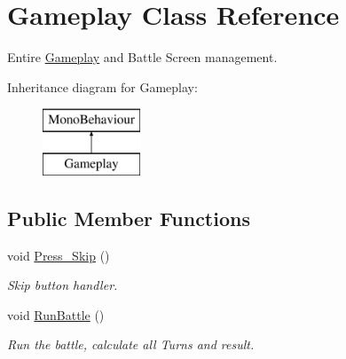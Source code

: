 \hypertarget{class_gameplay}{}\section{Gameplay Class Reference}
\label{class_gameplay}


Entire \mbox{\hyperlink{class_gameplay}{Gameplay}} and Battle Screen management.  


Inheritance diagram for Gameplay\+:\begin{figure}[H]
\begin{center}
\leavevmode
\includegraphics[height=2.000000cm]{class_gameplay}
\end{center}
\end{figure}
\subsection*{Public Member Functions}
\begin{DoxyCompactItemize}
\item 
\mbox{\label{class_gameplay_af68b4ea2b131c1c77a5daf9c5a0b5b5e}} 
void \mbox{\hyperlink{class_gameplay_af68b4ea2b131c1c77a5daf9c5a0b5b5e}{Press\+\_\+\+Skip}} ()
\begin{DoxyCompactList}\small\item\em Skip button handler. \end{DoxyCompactList}\item 
\mbox{\label{class_gameplay_a314779fdcab62c148dbf587aa0ab4f67}} 
void \mbox{\hyperlink{class_gameplay_a314779fdcab62c148dbf587aa0ab4f67}{Run\+Battle}} ()
\begin{DoxyCompactList}\small\item\em Run the battle, calculate all Turns and result. \end{DoxyCompactList}\end{DoxyCompactItemize}
